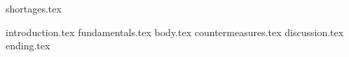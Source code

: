 \documentclass[runningheads]{llncs}
\begin{document}


{shortages.tex}

\newpage

{introduction.tex}
{fundamentals.tex}
{body.tex}
{countermeasures.tex}
{discussion.tex}
{ending.tex}



\printbibliography

\end{document}
